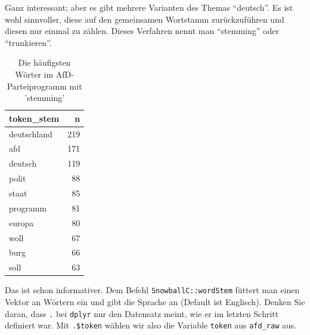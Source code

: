 \documentclass[12pt,ngerman,]{book}
\makeatletter
\newenvironment{Shaded}{\begin{snugshade}}{\end{snugshade}}
\newcommand{\KeywordTok}[1]{\textcolor[rgb]{0.13,0.29,0.53}{\textbf{#1}}}
\newcommand{\DataTypeTok}[1]{\textcolor[rgb]{0.13,0.29,0.53}{#1}}
\newcommand{\DecValTok}[1]{\textcolor[rgb]{0.00,0.00,0.81}{#1}}
\newcommand{\StringTok}[1]{\textcolor[rgb]{0.31,0.60,0.02}{#1}}
\newcommand{\OtherTok}[1]{\textcolor[rgb]{0.56,0.35,0.01}{#1}}
\newcommand{\OperatorTok}[1]{\textcolor[rgb]{0.81,0.36,0.00}{\textbf{#1}}}
\newcommand{\NormalTok}[1]{#1}
\newenvironment{kframe}{%
\medskip{}
\setlength{\fboxsep}{.8em}
 \def\at@end@of@kframe{}%
 \ifinner\ifhmode%
  \def\at@end@of@kframe{\end{minipage}}%
  \begin{minipage}{\columnwidth}%
 \fi\fi%
 \def\FrameCommand##1{\hskip\@totalleftmargin \hskip-\fboxsep
 \colorbox{shadecolor}{##1}\hskip-\fboxsep
     \hskip-\linewidth \hskip-\@totalleftmargin \hskip\columnwidth}%
 \MakeFramed {\advance\hsize-\width
   \@totalleftmargin\z@ \linewidth\hsize
   \@setminipage}}%
 {\par\unskip\endMakeFramed%
 \at@end@of@kframe}
\renewenvironment{Shaded}{\begin{kframe}}{\end{kframe}}
\theoremstyle{definition}
\theoremstyle{definition}
\theoremstyle{remark}
\makeatother
\begin{document}
Ganz interessant; aber es gibt mehrere Varianten des Themas ``deutsch''.
Es ist wohl sinnvoller, diese auf den gemeinsamen Wortstamm
zurückzuführen und diesen nur einmal zu zählen. Dieses Verfahren nennt
man ``stemming'' oder ``trunkieren''.

\begin{Shaded}
\end{Shaded}

\begin{table}

\caption{\label{tab:unnamed-chunk-20}Die häufigsten Wörter im AfD-Parteiprogramm mit 'stemming'}
\centering
\begin{tabular}[t]{l|r}
\hline
token\_stem & n\\
\hline
deutschland & 219\\
\hline
afd & 171\\
\hline
deutsch & 119\\
\hline
polit & 88\\
\hline
staat & 85\\
\hline
programm & 81\\
\hline
europa & 80\\
\hline
woll & 67\\
\hline
burg & 66\\
\hline
soll & 63\\
\hline
\end{tabular}
\end{table}

Das ist schon informativer. Dem Befehl \texttt{SnowballC::wordStem}
füttert man einen Vektor an Wörtern ein und gibt die Sprache an (Default
ist Englisch). Denken Sie daran, dass \texttt{.} bei \texttt{dplyr} nur
den Datensatz meint, wie er im letzten Schritt definiert war. Mit
\texttt{.\$token} wählen wir also die Variable \texttt{token} aus
\texttt{afd\_raw} aus.
\end{document}
